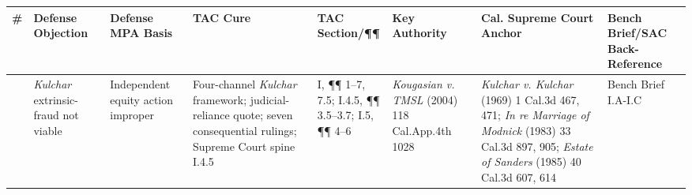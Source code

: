 {\def\LTcaptype{table} %
\begin{longtable}[]{@{}
  >{\raggedright\arraybackslash}p{}
  >{\raggedright\arraybackslash}p{}
  >{\raggedright\arraybackslash}p{}
  >{\raggedright\arraybackslash}p{}
  >{\raggedright\arraybackslash}p{}
  >{\raggedright\arraybackslash}p{}
  >{\raggedright\arraybackslash}p{}
  >{\raggedright\arraybackslash}p{}@{}}
\toprule\noalign{}
\begin{minipage}[b]{\linewidth}\raggedright
\#
\end{minipage} & \begin{minipage}[b]{\linewidth}\raggedright
Defense Objection
\end{minipage} & \begin{minipage}[b]{\linewidth}\raggedright
Defense MPA Basis
\end{minipage} & \begin{minipage}[b]{\linewidth}\raggedright
TAC Cure
\end{minipage} & \begin{minipage}[b]{\linewidth}\raggedright
TAC Section/¶¶
\end{minipage} & \begin{minipage}[b]{\linewidth}\raggedright
Key Authority
\end{minipage} & \begin{minipage}[b]{\linewidth}\raggedright
Cal. Supreme Court Anchor
\end{minipage} & \begin{minipage}[b]{\linewidth}\raggedright
Bench Brief/SAC Back-Reference
\end{minipage} \\
\midrule\noalign{}
\endhead
\bottomrule\noalign{}
\endlastfoot
1 & \emph{Kulchar} extrinsic-fraud not viable & Independent equity action improper & Four-channel \emph{Kulchar} framework; judicial-reliance quote; seven consequential rulings; Supreme Court spine \textsection{}I.4.5 & \textsection{}I, ¶¶ 1--7, 7.5; \textsection{}I.4.5, ¶¶ 3.5--3.7; \textsection{}I.5, ¶¶ 4--6 & \emph{Kougasian v. TMSL} (2004) 118 Cal.App.4th 1028 & \emph{Kulchar v. Kulchar} (1969) 1 Cal.3d 467, 471; \emph{In re Marriage of Modnick} (1983) 33 Cal.3d 897, 905; \emph{Estate of Sanders} (1985) 40 Cal.3d 607, 614 & Bench Brief \textsection{}\textsection{}I.A-I.C \\

\end{longtable}}
